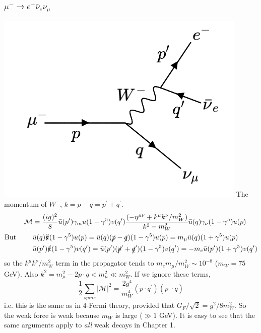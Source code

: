 \subsubsection{$\mu^- \to e^-\bar{\nu}_e\nu_\mu$}
  \includegraphics[width=0.4\linewidth]{figs/17b.png}
The momentum of $W^-$, $k=p-q=p^\prime + q^\prime$.
\begin{equation}
\begin{split}
\mathcal{M}& = \frac{(ig)^2}{8}\bar{u}(p^\prime)\gamma_mu(1-\gamma^5)v(q^\prime)\frac{(-\eta^{\mu \nu} + k^\mu k^\nu/m_W^2)}{k^2-m_W^2}\bar{u}(q)\gamma_\nu(1-\gamma^5)u(p) \\
\text{But } \qquad &\bar{u}(q)\slashed{k}(1-\gamma^5)u(p) = \bar{u}(q)(\slashed{p}-\slashed{q})(1-\gamma^5)u(p) = m_\mu \bar{u}(q)(1+\gamma^5)u(p) \\
&\bar{u}(p^\prime)\slashed{k}(1-\gamma^5)v(q^\prime) = \bar{u}(p^\prime)(\slashed{p}^\prime+\slashed{q}^\prime)(1-\gamma^5)v(q^\prime) = -m_e \bar{u}(p^\prime)(1+\gamma^5)v(q^\prime) 
\end{split}
\end{equation}
so the $k^\mu k^\nu/m_W^2$ term in the propagator tends to $m_e m_\mu/m_W^2 \sim 10^{-8}$ ($m_W=75$ GeV). Also $k^2 = m_\mu^2 - 2p \cdot q < m_\mu^2 \ll m_W^2$. If we ignore these terms, 
\begin{equation}
\frac{1}{2}\sum_{spins}|\mathcal{M}|^2 = \frac{2g^4}{m_W^4}(p \cdot q^\prime)(p^\prime \cdot q)
\end{equation}
i.e. this is the same as in 4-Fermi theory, provided that $G_F/\sqrt{2} = g^2/8m_W^2$. So the weak force is weak because $m_W$ is large ($\gg 1$ GeV). It is easy to see that the same arguments apply to \textit{all} weak decays in Chapter 1. 
%

